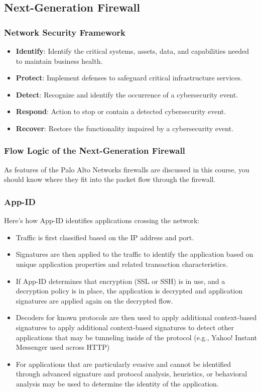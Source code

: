 \subsection{Next-Generation Firewall}
\subsubsection{Network Security Framework}
\begin{itemize}
    \item \textbf{Identify}: Identify the critical systems, assets, data, and capabilities needed to maintain business health.
    \item \textbf{Protect}: Implement defenses to safeguard critical infrastructure services.
    \item \textbf{Detect}: Recognize and identify the occurrence of a cybersecurity event.
    \item \textbf{Respond}: Action to stop or contain a detected cybersecurity event.
    \item \textbf{Recover}: Restore the functionality impaired by a cybersecurity event.
\end{itemize}

\subsubsection{Flow Logic of the Next-Generation Firewall}
As features of the Palo Alto Networks firewalls are discussed in this course, you should know where they fit into the packet flow through the firewall.

\subsubsection{App-ID}
Here's how App-ID identifies applications crossing the network:
\begin{itemize}
    \item Traffic is first classified based on the IP address and port.
    \item Signatures are then applied to the traffic to identify the application based on unique application properties and related transaction characteristics.
    \item If App-ID determines that encryption (SSL or SSH) is in use, and a decryption policy is in place, the application is decrypted and application signatures are applied again on the decrypted flow.
    \item Decoders for known protocols are then used to apply additional context-based signatures to apply additional context-based signatures to detect other applications that may be tunneling inside of the protocol (e.g., Yahoo! Instant Messenger used across HTTP)
    \item For applications that are particularly evasive and cannot be identified through advanced signature and protocol analysis, heuristics, or behavioral analysis may be used to determine the identity of the application.
\end{itemize}

